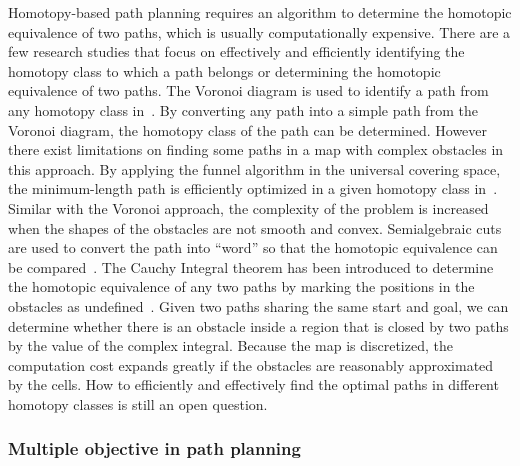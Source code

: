 \documentclass[phd]{byuprop}
\begin{document}
Homotopy-based path planning requires an algorithm to determine the homotopic equivalence of two paths, which is usually computationally expensive. 
There are a few research studies that focus on effectively and efficiently identifying the homotopy class to which a path belongs or determining the homotopic equivalence of two paths. 
The Voronoi diagram is used to identify a path from any homotopy class in~\cite{Banerjee2013}. 
By converting any path into a simple path from the Voronoi diagram, the homotopy class of the path can be determined. 
However there exist limitations on finding some paths in a map with complex obstacles in this approach.
By applying the funnel algorithm in the universal covering space, the minimum-length path is efficiently optimized in a given homotopy class in~\cite{Hershberger1994}. 
Similar with the Voronoi approach, the complexity of the problem is increased when the shapes of the obstacles are not smooth and convex. 
Semialgebraic cuts are used to convert the path into “word” so that the homotopic equivalence can be compared~\cite{Grigoriev1998}. 
The Cauchy Integral theorem has been introduced to determine the homotopic equivalence of any two paths by marking the positions in the obstacles as undefined~\cite{Bhattachary2010}. 
Given two paths sharing the same start and goal, we can determine whether there is an obstacle inside a region that is closed by two paths by the value of the complex integral. 
Because the map is discretized, the computation cost expands greatly if the obstacles are reasonably approximated by the cells.
How to efficiently and effectively find the optimal paths in different homotopy classes is still an open question.

\subsubsection{Multiple objective in path planning}
\end{document}
